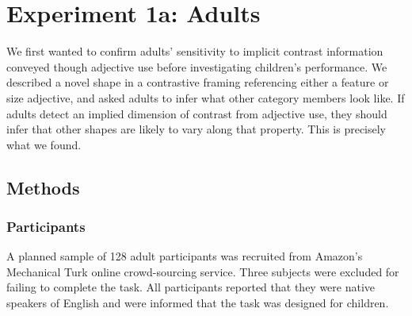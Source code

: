 \documentclass[10pt,letterpaper]{article}
\begin{document}
\section{Experiment 1a: Adults} 

We first wanted to confirm adults' sensitivity to implicit contrast information conveyed though adjective use before investigating children's performance.  We described a novel shape in a contrastive framing referencing either a feature or size adjective, and asked adults to infer what other category members look like.  If adults detect an implied dimension of contrast from adjective use, they should infer that other shapes are likely to vary along that property.  This is precisely what we found.  





\subsection{Methods}

\subsubsection{Participants}

A planned sample of 128 adult participants was recruited from Amazon's Mechanical Turk online crowd-sourcing service.  Three subjects were excluded for failing to complete the task. All participants reported that they were native speakers of English and were informed that the task was designed for children.  
\end{document}
